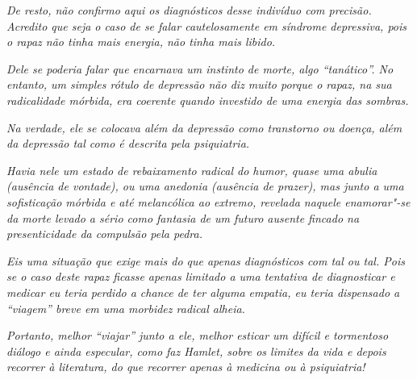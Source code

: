 \emph{De resto, não confirmo aqui os diagnósticos desse indivíduo com
precisão. Acredito que seja o caso de se falar cautelosamente em
síndrome depressiva, pois o rapaz não tinha mais energia, não tinha mais
libido.}

\emph{Dele se poderia falar que encarnava um instinto de morte, algo
``tanático''. No entanto, um simples rótulo de depressão não diz muito
porque o rapaz, na sua radicalidade mórbida, era coerente quando
investido de uma energia das sombras.}

\emph{Na verdade, ele se colocava além da depressão como transtorno ou
doença, além da depressão tal como é descrita pela psiquiatria.}

\emph{Havia nele um estado de rebaixamento radical do humor, quase uma
abulia (ausência de vontade), ou uma anedonia (ausência de prazer), mas
junto a uma sofisticação mórbida e até melancólica ao extremo, revelada
naquele enamorar"-se da morte levado a sério como fantasia de um futuro
ausente fincado na presenticidade da compulsão pela pedra.}

\emph{Eis uma situação que exige mais do que apenas diagnósticos com 
tal ou  tal. Pois se o caso deste rapaz ficasse apenas limitado a uma
tentativa de diagnosticar e medicar eu teria perdido a chance de ter
alguma empatia, eu teria dispensado a ``viagem'' breve em uma morbidez
radical alheia.}

\emph{Portanto, melhor ``viajar'' junto a ele, melhor esticar um difícil
e tormentoso diálogo e ainda especular, como faz Hamlet, sobre os
limites da vida e depois recorrer à literatura, do que recorrer apenas à
medicina ou à psiquiatria!}
\endgroup